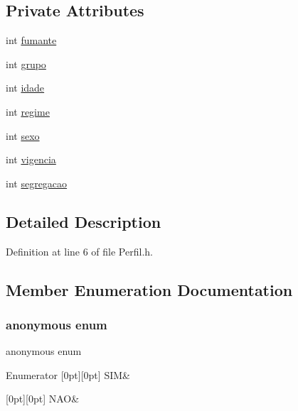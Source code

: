 \subsection*{Private Attributes}
\begin{DoxyCompactItemize}
\item 
int \hyperlink{class_perfil_a4ced26fed0c87e3fa425bc3d7e8cdc87}{fumante}
\item 
int \hyperlink{class_perfil_ad6408bcf9e079be0f8d5df42c0d9a080}{grupo}
\item 
int \hyperlink{class_perfil_a310f83d33bf7be6a42b8c91d767e3597}{idade}
\item 
int \hyperlink{class_perfil_a4194b50257455f7c9d7c92555344ed47}{regime}
\item 
int \hyperlink{class_perfil_a811437646338aa346006d4edd7fda9e0}{sexo}
\item 
int \hyperlink{class_perfil_ad5fdbf33a924b01cb3e30c364fde8a56}{vigencia}
\item 
int \hyperlink{class_perfil_a007271b5f462827a6ade8af3a9ff0dc5}{segregacao}
\end{DoxyCompactItemize}


\subsection{Detailed Description}


Definition at line 6 of file Perfil.\+h.



\subsection{Member Enumeration Documentation}
\hypertarget{class_perfil_a9f55b99cc5dabbe0b75f0bce279107f3}{}\label{class_perfil_a9f55b99cc5dabbe0b75f0bce279107f3} 
\subsubsection{\texorpdfstring{anonymous enum}{anonymous enum}}
{\footnotesize\ttfamily anonymous enum}

\begin{DoxyEnumFields}{Enumerator}
[0pt][0pt]{}\hypertarget{class_perfil_a9f55b99cc5dabbe0b75f0bce279107f3a643e2b60235b086a2bcd2c1aededfa61}{}\label{class_perfil_a9f55b99cc5dabbe0b75f0bce279107f3a643e2b60235b086a2bcd2c1aededfa61} 
S\+IM&\\
\hline

[0pt][0pt]{}\hypertarget{class_perfil_a9f55b99cc5dabbe0b75f0bce279107f3ac94358468c320a7c2ba0f437aab8b600}{}\label{class_perfil_a9f55b99cc5dabbe0b75f0bce279107f3ac94358468c320a7c2ba0f437aab8b600} 
N\+AO&\\
\hline

\end{DoxyEnumFields}


